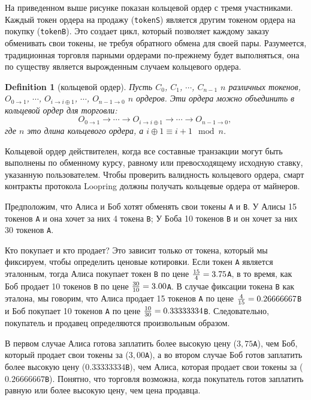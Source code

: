 \documentclass[utf8,nofonts]{article}
\makeatletter
\newtheorem{definition}{Definition}[section]
\newenvironment{figurehere}
 {\def\@captype{figure}}
 {}
\makeatother
\begin{document}
\begin{multicols}{2}
\begin{center}
\begin{figurehere}
			\caption{Кольцевой ордер с 3 участниками}
			\label{fig:ring}
		\end{figurehere}
	\end{center}
	
	
	На приведенном выше рисунке показан кольцевой ордер с тремя участниками. Каждый токен ордера на продажу (\verb|tokenS|) является другим токеном ордера на покупку (\verb|tokenB|). Это создает цикл, который позволяет каждому заказу обменивать свои токены, не требуя обратного обмена для своей пары. Разумеется, традиционная торговля парными ордерами по-прежнему будет выполняться, она по существу является вырожденным случаем кольцевого ордера. 
	
	\begin{definition}[кольцевой ордер] Пусть $C_{0}$, $C_{1}$, $\cdots$, $C_{n-1}$ $n$ различных токенов, $O_{0\rightarrow 1}$, $\cdots$, $O_{i\rightarrow i\oplus 1}$, $\cdots$, $O_{n-1 \rightarrow 0}$ $n$ ордеров. Эти ордера можно объединить в кольцевой ордер для торговли:
		$$O_{0\rightarrow 1} \rightarrow \cdots \rightarrow O_{i\rightarrow i\oplus 1} \rightarrow \cdots \rightarrow O_{n-1\rightarrow 0} \text{, }$$
		где $n$ это длина кольцевого ордера, а $i\oplus 1 \equiv i+1 \mod n$.
	\end{definition}
	
	Кольцевой ордер действителен, когда все составные транзакции могут быть выполнены по обменному курсу, равному или превосходящему исходную ставку, указанную пользователем. Чтобы проверить валидность кольцевого ордера, смарт контракты протокола Loopring должны получать кольцевые ордера от майнеров.
	
	Предположим, что Алиса и Боб хотят обменять свои токены \verb|A| и \verb|B|. У Алисы 15 токенов \verb|A| и она хочет за них 4 токена \verb|B|; У Боба 10 токенов \verb|B| и он хочет за них 30 токенов \verb|A|.
	
	Кто покупает и кто продает? Это зависит только от токена, который мы фиксируем, чтобы определить ценовые котировки. Если токен \verb|A| является эталонным, тогда Алиса покупает токен \verb|B| по цене $ {15 \over 4} = 3.75 $\verb|A|, в то время, как Боб продает 10 токенов \verb|B| по цене $ {30 \over 10} = 3.00 $\verb|A|. В случае фиксации токена \verb|B| как эталона, мы говорим, что Алиса продает 15 токенов \verb|A| по цене $ {4 \over 15} = 0.26666667 $\verb|B| и Боб покупает 10 токенов \verb|A| по цене $ {10 \over 30} = 0.33333334 $\verb|B|. Следовательно, покупатель и продавец определяются произвольным образом.
	
	В первом случае Алиса готова заплатить более высокую цену ($ 3,75 $\verb|A|), чем Боб, который продает свои токены за ($ 3,00 $\verb|A|), а во втором случае Боб готов заплатить более высокую цену ($ 0.33333334 $\verb|B|), чем Алиса, которая продает свои токены за ($ 0.26666667 $\verb|B|). Понятно, что торговля возможна, когда покупатель готов заплатить равную или более высокую цену, чем цена продавца.
	

\end{multicols}
\end{document}
